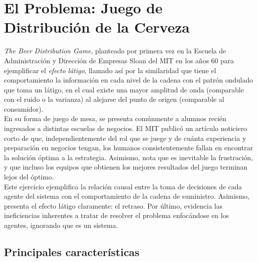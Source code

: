 \chapter{El Problema: Juego de Distribuci\'on de la Cerveza}






\textit{The Beer Distribution Game}, planteado por primera vez en la Escuela de Administraci\'on y Direcci\'on de Empresas Sloan del MIT en los años 60 para ejemplificar el \textit{efecto l\'atigo}, llamado as\'i por la similaridad que tiene el comportamiento la informaci\'on en cada nivel de la cadena con el patr\'on ondulado que toma un l\'atigo, en el cual existe una mayor amplitud de onda (comparable con el ruido o la varianza) al alejarse del punto de origen (comparable al consumidor). \\

En su forma de juego de mesa, se presenta com\'unmente a alumnos reci\'en ingresados a distintas escuelas de negocios. El MIT public\'o un art\'iculo noticiero corto de \citet{Dizikes} que, independientemente del rol que se juege y de cu\'anta experiencia y preparaci\'on en negocios tengan, los humanos consistentemente fallan en encontrar la soluci\'on \'optima a la estrategia. Asimismo, nota que es inevitable la frustraci\'on, y que incluso los equipos que obtienen los mejores resultados del juego terminan lejos del \'optimo. \\

Este ejercicio ejemplifica la relaci\'on causal entre la toma de decisiones de cada agente del sistema con el comportamiento de la cadena de suministro. Asimismo, presenta el efecto l\'atigo claramente: el retraso. Por \'ultimo, evidencia las ineficiencias inherentes a tratar de resolver el problema enfoc\'andose en los agentes, ignorando que es un sistema. 


\section{Principales caracter\'isticas}

